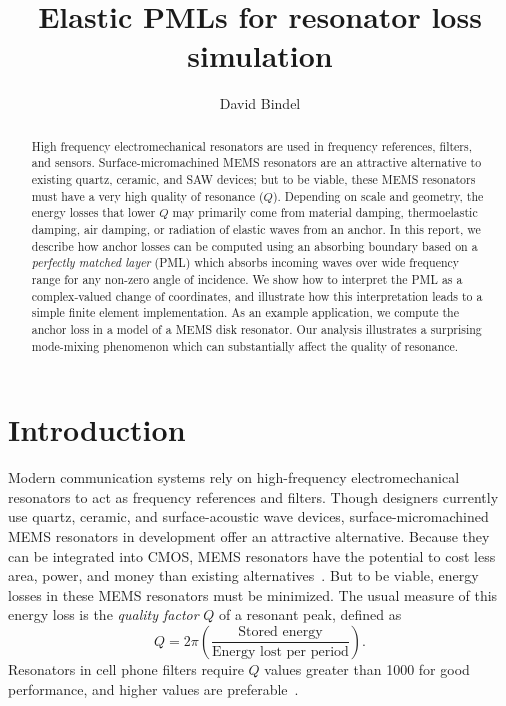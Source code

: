 \documentclass{article}
\title{Elastic PMLs for resonator loss simulation}
\author{David Bindel}
\begin{document}
\maketitle

\begin{abstract}
  High frequency electromechanical resonators are used in frequency
  references, filters, and sensors.  Surface-micromachined
  MEMS resonators are an attractive alternative to existing quartz,
  ceramic, and SAW devices; but to be viable, these MEMS resonators must
  have a very high quality of resonance ($Q$).  Depending on scale and
  geometry, the energy losses that lower $Q$ may primarily come from
  material damping, thermoelastic damping, air damping, or radiation of
  elastic waves from an anchor.  In this report, we describe how
  anchor losses can be computed using an absorbing boundary
  based on a \emph{perfectly matched layer} (PML) which absorbs
  incoming waves over wide frequency range for any non-zero angle of
  incidence.  We show how to interpret the PML as a complex-valued
  change of coordinates, and illustrate how this interpretation leads
  to a simple finite element implementation.  As an example application,
  we compute the anchor loss in a model of a MEMS disk resonator.
  Our analysis illustrates a surprising mode-mixing phenomenon which can
  substantially affect the quality of resonance.
\end{abstract}


\section{Introduction}

Modern communication systems rely on high-frequency electromechanical
resonators to act as frequency references and filters.  Though
designers currently use quartz, ceramic, and surface-acoustic wave
devices, surface-micromachined MEMS resonators in development offer an
attractive alternative.  Because they can be integrated into CMOS,
MEMS resonators have the potential to cost less area, power, and money
than existing alternatives~\cite{Nguyen:2001:VRM}.  But to be viable,
energy losses in these MEMS resonators must be minimized.  The usual
measure of this energy loss is the \emph{quality factor} $Q$ of a
resonant peak, defined as
\begin{equation}
  \label{Q-def}
  Q = 2 \pi \left(
      \frac{\mbox{Stored energy}}
           {\mbox{Energy lost per period}}
      \right).
\end{equation}
Resonators in cell phone filters require $Q$ values greater than 1000
for good performance, and higher values are 
preferable~\cite{Nguyen:2001:VRM,Aigner:2003:RFM}.
\end{document}
